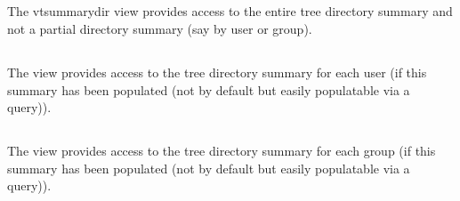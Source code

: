 \subsection{\vtsummarydir}
The vtsummarydir view provides access to the entire tree directory
summary and not a partial directory summary (say by user or group).

\subsection{\vtsummaryuser}
The \vtsummaryuser view provides access to the tree directory summary
for each user (if this summary has been populated (not by default but
easily populatable via a query)).

\subsection{\vtsummarygroup}
The \vtsummarygroup view provides access to the tree directory summary
for each group (if this summary has been populated (not by default but
easily populatable via a query)).
